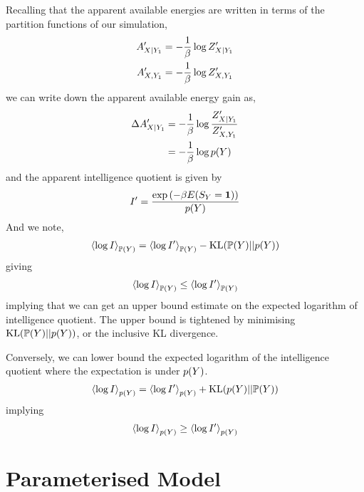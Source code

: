 \documentclass[]{article}
\begin{document}
Recalling that the apparent available energies are written in terms of the partition functions of our simulation,
\begin{align*}
A^\prime_{X|Y_1} & = - \frac{1}{\beta} \log Z_{X|Y_1}^\prime \\
A^\prime_{X,Y_1} & = - \frac{1}{\beta} \log Z_{X,Y_1}^\prime
\end{align*}
we can write down the apparent available energy gain as,
\begin{align*}
\Delta A^\prime_{X|Y_1} & = - \frac{1}{\beta} \log \frac{Z_{X|Y_1}^\prime}{Z_{X,Y_1}^\prime}\\
& = -\frac{1}{\beta} \log p(Y)
\end{align*}
and the apparent intelligence quotient is given by
\[
I^\prime =\frac{\exp\left(-\beta E(S_Y=\textbf{1})\right)}{p(Y)}
\]
And we note, 
\[
\left\langle \log I \right\rangle_{\mathbb{P}(Y)} = \left\langle \log I^\prime \right\rangle_{\mathbb{P}(Y)} - \text{KL}(\mathbb{P}(Y)||p(Y))
\]
giving 
\[
\left\langle \log I \right\rangle_{\mathbb{P}(Y)} \leq \left\langle \log I^\prime \right\rangle_{\mathbb{P}(Y)}
\] 
implying that we can get an upper bound estimate on the expected logarithm of intelligence quotient. The upper bound is tightened by minimising $\text{KL}(\mathbb{P}(Y)||p(Y))$, or the inclusive KL divergence. 

Conversely, we can lower bound the expected logarithm of the intelligence quotient where the expectation is under $p(Y)$. 
\[
\left\langle \log I \right\rangle_{p(Y)} = \left\langle \log I^\prime \right\rangle_{p(Y)} + \text{KL}(p(Y)||\mathbb{P}(Y))
\]
implying
\[
\left\langle \log I \right\rangle_{p(Y)} \geq \left\langle \log I^\prime \right\rangle_{p(Y)}
\]

\section{Parameterised Model}
\end{document}
